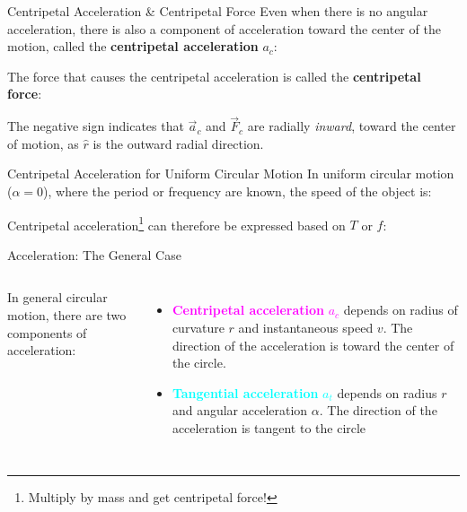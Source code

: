 \documentclass[12pt,compress,aspectratio=169]{beamer}
\begin{document}
\begin{frame}{Centripetal Acceleration \& Centripetal Force}
  Even when there is no angular acceleration, there is also a component of
  acceleration toward the center of the motion, called the
  \textbf{centripetal acceleration} $a_c$:


  The force that causes the centripetal acceleration is
  called the \textbf{centripetal force}:


  The negative sign indicates that $\vec a_c$ and $\vec F_c$ are radially
  \emph{inward}, toward the center of motion, as $\hat r$ is the outward radial
  direction.
\end{frame}



\begin{frame}{Centripetal Acceleration for Uniform Circular Motion}
  In uniform circular motion ($\alpha=0$), where the period or frequency are
  known, the speed of the object is:


  Centripetal acceleration\footnote{Multiply by mass and get centripetal
  force!} can therefore be expressed based on $T$ or $f$:

\end{frame}



\begin{frame}{Acceleration: The General Case}
  \begin{columns}
    
    In general circular motion, there are two components of acceleration:
    \begin{itemize}
    \item\textcolor{magenta}{\textbf{Centripetal acceleration} $a_c$} depends on
      radius of curvature $r$ and instantaneous speed $v$. The direction of
      the acceleration is toward the center of the circle.
    \item \textcolor{cyan}{\textbf{Tangential acceleration} $a_t$}
      depends on radius $r$  and angular acceleration $\alpha$. The direction
      of the acceleration is tangent to the circle
    \end{itemize}
  \end{columns}
\end{frame}
\end{document}
